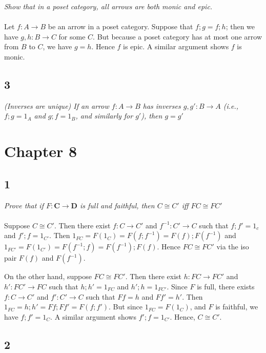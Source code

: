 \documentclass{article}
\newcommand{\mbf}{\mathbf}
\begin{document}
\emph{Show that in a poset category, all arrows are both monic and epic.}\\~\\
Let $f : A \to B$ be an arrow in a poset category. Suppose that $f;g = f;h$; then
we have $g,h : B \to C$ for some $C$. But because a poset category has at most 
one arrow from $B$ to $C$, we have $g = h$. Hence $f$ is epic. A similar argument
shows $f$ is monic.

\subsection{3}

\emph{(Inverses are unique) If an arrow $f : A \to B$ has inverses $g,g' : B \to A$ (i.e., $f;g = 1_A$ and $g;f = 1_B$, 
 and similarly for $g'$), then $g = g'$}
 


\section{Chapter 8}

\subsection{1}

\emph{Prove that if $F : \mbf{C} \to \mbf{D}$ is full and faithful, then $C \cong C'$ iff $FC \cong FC'$} \\~\\

Suppose $C \cong C'$. Then there exist $f : C \to C'$ and $f^{-1} : C' \to C$ such that $f;f' = 1_c$ and $f';f = 1_{C'}$.
Then $1_{FC} = F(1_C) = F(f;f^{-1}) = F(f);F(f^{-1})$ and $1_{FC'} = F(1_{C'}) = F(f^{-1};f) = F(f^{-1});F(f)$. Hence $FC \cong FC'$ via
the iso pair $F(f)$ and $F(f^{-1})$.

On the other hand, suppose $FC \cong FC'$. Then there exist $h : FC \to FC'$ and $h' : FC' \to FC$ such that 
$h;h' = 1_{FC}$ and $h';h = 1_{FC'}$. Since $F$ is full, there exists $f : C \to C'$ and $f' : C' \to C$ 
such that $Ff = h$ and $Ff' = h'$. Then $1_{FC} = h;h' = Ff;Ff' = F(f;f')$. But since $1_{FC} = F(1_{C})$, and $F$ 
is faithful, we have $f;f' = 1_C$. A similar argument shows $f';f = 1_{C'}$. Hence, $C \cong C'$.

\subsection{2}
\end{document}
